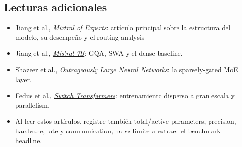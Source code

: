 \documentclass[a4paper]{article}
\begin{document}
\subsection{Lecturas adicionales}

\begin{itemize}
  \item Jiang et al., \href{https://arxiv.org/abs/2401.04088}{\emph{Mixtral of Experts}}: artículo principal sobre la estructura del modelo, su desempeño y el routing analysis.
  \item Jiang et al., \href{https://arxiv.org/abs/2310.06825}{\emph{Mistral 7B}}: GQA, SWA y el dense baseline.
  \item Shazeer et al., \href{https://arxiv.org/abs/1701.06538}{\emph{Outrageously Large Neural Networks}}: la sparsely-gated MoE layer.
  \item Fedus et al., \href{https://arxiv.org/abs/2101.03961}{\emph{Switch Transformers}}: entrenamiento disperso a gran escala y parallelism.
  \item Al leer estos artículos, registre también total/active parameters, precision, hardware, lote y communication; no se limite a extraer el benchmark headline.
\end{itemize}
\end{document}
